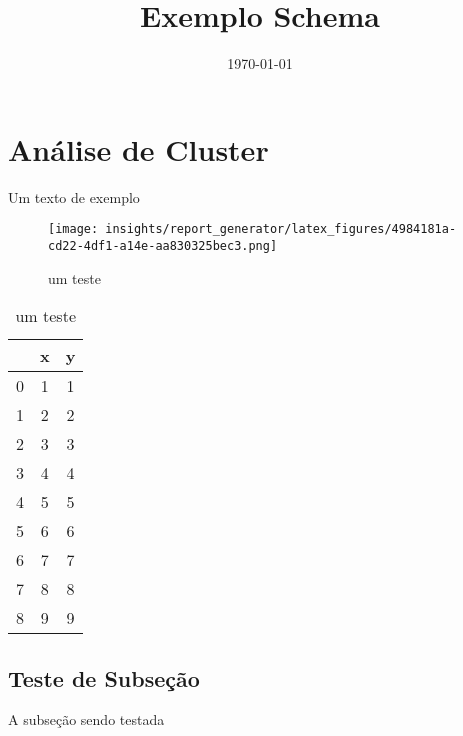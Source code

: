 \documentclass{article}%
\title{Exemplo Schema}%
\date{\today}%
\begin{document}
%
\normalsize%
\maketitle%
\clearpage%
\section{Análise de Cluster}%
\label{sec:AnlisedeCluster}%
Um texto de exemplo%
\newline%


\begin{figure}%
\centering%
\texttt{[image: insights/report\_generator/latex\_figures/4984181a-cd22-4df1-a14e-aa830325bec3.png]}%
\caption{um teste}%
\end{figure}

%


\begin{table}[htbp]%
\caption{um teste}%
\centering%
\begin{tabular}{ccc}
\toprule
{} &  x &  y \\
\midrule
0 &  1 &  1 \\
1 &  2 &  2 \\
2 &  3 &  3 \\
3 &  4 &  4 \\
4 &  5 &  5 \\
5 &  6 &  6 \\
6 &  7 &  7 \\
7 &  8 &  8 \\
8 &  9 &  9 \\
\bottomrule
\end{tabular}
%
\end{table}

%
\subsection{Teste de Subseção}%
\label{subsec:TestedeSubseo}%
A subseção sendo testada%
\newline

%
\FloatBarrier%
\end{document}
